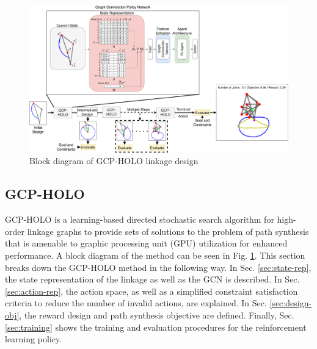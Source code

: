 \begin{figure}
    \centering
    \includegraphics[width=\linewidth]{02_figure_block_diagram_revised.png}
    \caption{Block diagram of GCP-HOLO linkage design}
    \label{fig:gcp-holo_block}
\end{figure}

\subsection{GCP-HOLO}\label{sec:gcp-holo}
GCP-HOLO is a learning-based directed stochastic search algorithm for high-order linkage graphs to provide sets of solutions to the problem of path synthesis that is amenable to graphic processing unit (GPU) utilization for enhanced performance. A block diagram of the method can be seen in Fig. \ref{fig:gcp-holo_block}. This section breaks down the GCP-HOLO method in the following way. In Sec. \ref{sec:state-rep}, the state representation of the linkage as well as the GCN is described. In Sec. \ref{sec:action-rep}, the action space, as well as a simplified constraint satisfaction criteria to reduce the number of invalid actions, are explained. In Sec. \ref{sec:design-obj}, the reward design and path synthesis objective are defined. Finally, Sec. \ref{sec:training} shows the training and evaluation procedures for the reinforcement learning policy.

